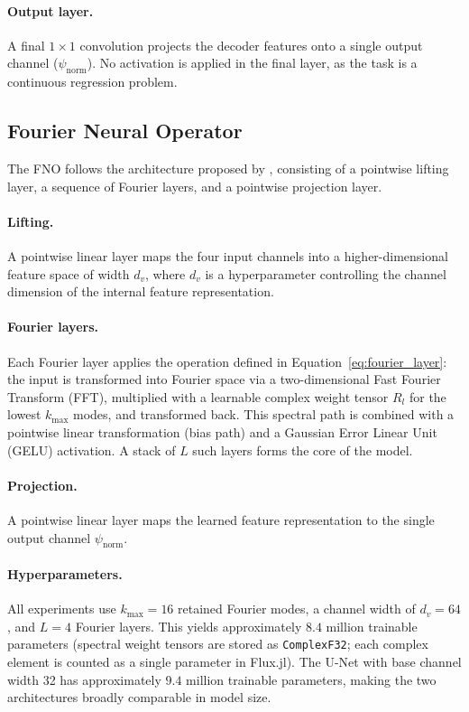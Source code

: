 \paragraph{Output layer.}
A final $1\times1$ convolution projects the decoder features onto a single output channel ($\psi_{\mathrm{norm}}$). No activation is applied in the final layer, as the task is a continuous regression problem.

\subsection{Fourier Neural Operator}
\label{sec:fno_architecture}

The FNO follows the architecture proposed by \textcite{li_fourier_2021}, consisting of a pointwise lifting layer, a sequence of Fourier layers, and a pointwise projection layer.

\paragraph{Lifting.}
A pointwise linear layer maps the four input channels into a higher-dimensional feature space of width $d_v$, where $d_v$ is a hyperparameter controlling the channel dimension of the internal feature representation.

\paragraph{Fourier layers.}
Each Fourier layer applies the operation defined in Equation~\eqref{eq:fourier_layer}: the input is transformed into Fourier space via a two-dimensional Fast Fourier Transform (FFT), multiplied with a learnable complex weight tensor $R_l$ for the lowest $k_{\max}$ modes, and transformed back. This spectral path is combined with a pointwise linear transformation (bias path) and a Gaussian Error Linear Unit (GELU) activation. A stack of $L$ such layers forms the core of the model.

\paragraph{Projection.}
A pointwise linear layer maps the learned feature representation to the single output channel $\psi_{\mathrm{norm}}$.

\paragraph{Hyperparameters.}
All experiments use $k_{\max} = 16$ retained Fourier modes, a channel width of $d_v = 64$, and $L = 4$ Fourier layers. This yields approximately $8.4$ million trainable parameters (spectral weight tensors are stored as \texttt{ComplexF32}; each complex element is counted as a single parameter in Flux.jl). The U-Net with base channel width 32 has approximately $9.4$ million trainable parameters, making the two architectures broadly comparable in model size.

